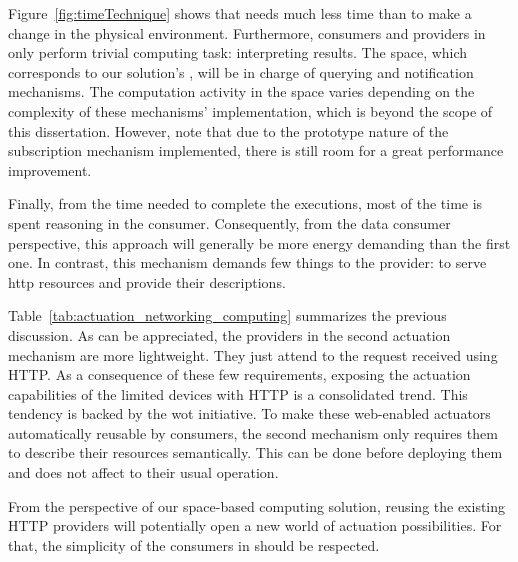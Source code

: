 

Figure~\ref{fig:timeTechnique} shows that \spaceActuation{} needs much less time than \restActuation{} to make a change in the physical environment.
Furthermore, consumers and providers in \spaceActuation{} only perform trivial computing task: interpreting results. %
The space, which corresponds to our solution's \coordspace{}, will be in charge of querying and notification mechanisms.
The computation activity in the space varies depending on the complexity of these mechanisms' implementation, which is beyond the scope of this dissertation.
However, note that due to the prototype nature of the subscription mechanism implemented, there is still room for a great performance improvement. %


Finally, from the time needed to complete the \restActuation{} executions, most of the time is spent reasoning in the consumer.
Consequently, from the data consumer perspective, this approach will generally be more energy demanding than the first one. %
In contrast, this mechanism demands few things to the provider: to serve \ac{http} resources and provide their descriptions. %


\bigskip





Table~\ref{tab:actuation_networking_computing} summarizes the previous discussion.
As can be appreciated, the providers in the second actuation mechanism are more lightweight.
They just attend to the request received using HTTP.
As a consequence of these few requirements, exposing the actuation capabilities of the limited devices with HTTP is a consolidated trend.
This tendency is backed by the \ac{wot} initiative.
To make these web-enabled actuators automatically reusable by consumers, the second mechanism only requires them to describe their resources semantically.
This can be done before deploying them and does not affect to their usual operation.


From the perspective of our space-based computing solution, reusing the existing HTTP providers will potentially open a new world of actuation possibilities.
For that, the simplicity of the consumers in \spaceActuation{} should be respected. %


